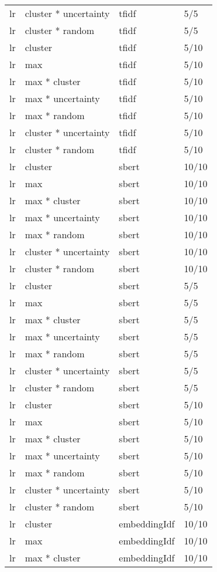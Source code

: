 \documentclass[12pt,twoside]{reedthesis}
\begin{document}
\begin{longtable}{llll}
lr & cluster * uncertainty & tfidf & 5/5\\
lr & cluster * random & tfidf & 5/5\\
lr & cluster & tfidf & 5/10\\
\addlinespace
lr & max & tfidf & 5/10\\
lr & max * cluster & tfidf & 5/10\\
lr & max * uncertainty & tfidf & 5/10\\
lr & max * random & tfidf & 5/10\\
lr & cluster * uncertainty & tfidf & 5/10\\
\addlinespace
lr & cluster * random & tfidf & 5/10\\
lr & cluster & sbert & 10/10\\
lr & max & sbert & 10/10\\
lr & max * cluster & sbert & 10/10\\
lr & max * uncertainty & sbert & 10/10\\
\addlinespace
lr & max * random & sbert & 10/10\\
lr & cluster * uncertainty & sbert & 10/10\\
lr & cluster * random & sbert & 10/10\\
lr & cluster & sbert & 5/5\\
lr & max & sbert & 5/5\\
\addlinespace
lr & max * cluster & sbert & 5/5\\
lr & max * uncertainty & sbert & 5/5\\
lr & max * random & sbert & 5/5\\
lr & cluster * uncertainty & sbert & 5/5\\
lr & cluster * random & sbert & 5/5\\
\addlinespace
lr & cluster & sbert & 5/10\\
lr & max & sbert & 5/10\\
lr & max * cluster & sbert & 5/10\\
lr & max * uncertainty & sbert & 5/10\\
lr & max * random & sbert & 5/10\\
\addlinespace
lr & cluster * uncertainty & sbert & 5/10\\
lr & cluster * random & sbert & 5/10\\
lr & cluster & embeddingIdf & 10/10\\
lr & max & embeddingIdf & 10/10\\
lr & max * cluster & embeddingIdf & 10/10\\

\end{longtable}
\end{document}

